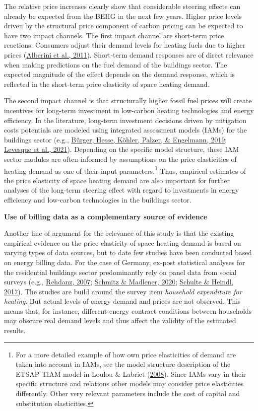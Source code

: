 \documentclass[12pt,twoside]{reedthesis}
\begin{document}
The relative price increases clearly show that considerable steering effects can already be expected from the BEHG in the next few years. Higher price levels driven by the structural price component of carbon pricing can be expected to have two impact channels. The first impact channel are short-term price reactions. Consumers adjust their demand levels for heating fuels due to higher prices (\protect\hyperlink{ref-alberini_etal11}{Alberini et al., 2011}). Short-term demand responses are of direct relevance when making predictions on the fuel demand of the buildings sector. The expected magnitude of the effect depends on the demand response, which is reflected in the short-term price elasticity of space heating demand.

The second impact channel is that structurally higher fossil fuel prices will create incentives for long-term investment in low-carbon heating technologies and energy efficiency. In the literature, long-term investment decisions driven by mitigation costs potentials are modeled using integrated assessment models (IAMs) for the buildings sector (e.g., \protect\hyperlink{ref-burger_etal19}{Bürger, Hesse, Köhler, Palzer, \& Engelmann, 2019}; \protect\hyperlink{ref-levesque_etal21}{Levesque et al., 2021}). Depending on the specific model structure, these IAM sector modules are often informed by assumptions on the price elasticities of heating demand as one of their input parameters.\footnote{For a more detailed example of how own price elasticities of demand are taken into account in IAMs, see the model structure description of the ETSAP TIAM model in Loulou \& Labriet (\protect\hyperlink{ref-loulou_labriet08}{2008}). Since IAMs vary in their specific structure and relations other models may consider price elasticities differently. Other very relevant parameters include the cost of capital and substitution elasticities.} Thus, empirical estimates of the price elasticity of space heating demand are also important for further analyses of the long-term steering effect with regard to investments in energy efficiency and low-carbon technologies in the buildings sector.

\textbf{Use of billing data as a complementary source of evidence}

Another line of argument for the relevance of this study is that the existing empirical evidence on the price elasticity of space heating demand is based on varying types of data sources, but to date few studies have been conducted based on energy billing data. For the case of Germany, ex-post statistical analyses for the residential buildings sector predominantly rely on panel data from social surveys (e.g., \protect\hyperlink{ref-rehdanz07}{Rehdanz, 2007}; \protect\hyperlink{ref-schmitz_madlener20}{Schmitz \& Madlener, 2020}; \protect\hyperlink{ref-schulte_heindl17}{Schulte \& Heindl, 2017}). The studies are build around the survey item \emph{household expenditure for heating}. But actual levels of energy demand and prices are not observed. This means that, for instance, different energy contract conditions between households may obscure real demand levels and thus affect the validity of the estimated results.
\end{document}
